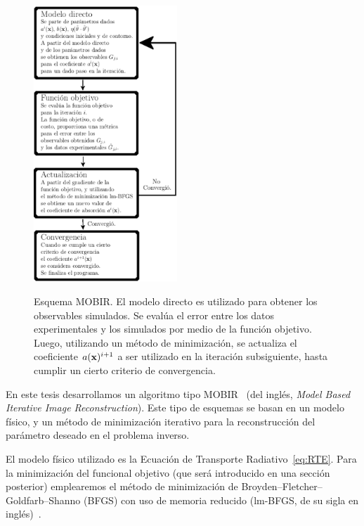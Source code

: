 \begin{figure}
  \includegraphics[width=0.48\textwidth]{figuras/mobir.eps}\\
  \caption{Esquema  MOBIR. El modelo directo es utilizado para obtener los observables simulados. Se evalúa el error entre los datos experimentales y los simulados por medio de la función objetivo. 
  Luego, utilizando un método de minimización, se actualiza el coeficiente $a(\mathbf{x})^{i+1}$ a 
  ser utilizado en la iteración subsiguiente, hasta cumplir 
  un cierto criterio de convergencia. }
 \label{fig:mobir}
\end{figure}

En este tesis desarrollamos un algoritmo tipo MOBIR~\cite{Hielscher1999,Kim2010} (del inglés, {\em Model Based Iterative Image  
Reconstruction}). Este tipo de esquemas se basan en un modelo físico, y un método de minimización 
iterativo para la reconstrucción del parámetro deseado en el problema inverso.

El modelo físico utilizado es la Ecuación de Transporte Radiativo~\eqref{eq:RTE}. 
Para la minimización del funcional objetivo (que será introducido en una sección posterior) emplearemos el método de minimización 
de Broyden–Fletcher–Goldfarb–Shanno (BFGS) con uso de memoria reducido 
(lm-BFGS, de su sigla en inglés)~\cite{Byrd1995}. 

